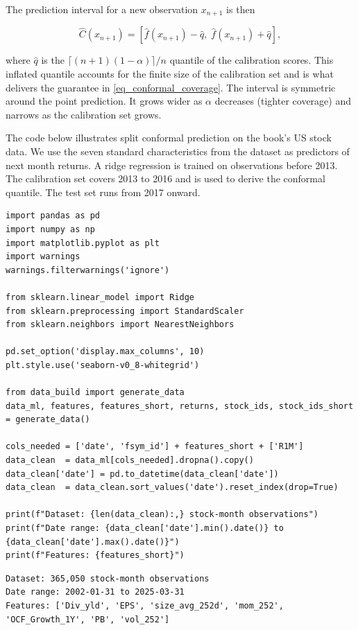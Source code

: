 The prediction interval for a new observation $x_{n+1}$ is then

\begin{equation}
\label{eq_conformal_interval}
\hat{C}(x_{n+1}) = [\hat{f}(x_{n+1}) - \hat{q},\; \hat{f}(x_{n+1}) + \hat{q}],
\end{equation}

where $\hat{q}$ is the $\lceil(n+1)(1 -\alpha)\rceil/n$ quantile of the calibration scores. This inflated quantile accounts for the finite size of the calibration set and is what delivers the guarantee in \ref{eq_conformal_coverage}. The interval is symmetric around the point prediction. It grows wider as $\alpha$ decreases (tighter coverage) and narrows as the calibration set grows.

The code below illustrates split conformal prediction on the book's US stock data. We use the seven standard characteristics from the dataset as predictors of next month returns. A ridge regression is trained on observations before 2013. The calibration set covers 2013 to 2016 and is used to derive the conformal quantile. The test set runs from 2017 onward.

\begin{verbatim}
import pandas as pd
import numpy as np
import matplotlib.pyplot as plt
import warnings
warnings.filterwarnings('ignore')

from sklearn.linear_model import Ridge
from sklearn.preprocessing import StandardScaler
from sklearn.neighbors import NearestNeighbors

pd.set_option('display.max_columns', 10)
plt.style.use('seaborn-v0_8-whitegrid')

from data_build import generate_data
data_ml, features, features_short, returns, stock_ids, stock_ids_short = generate_data()

cols_needed = ['date', 'fsym_id'] + features_short + ['R1M']
data_clean  = data_ml[cols_needed].dropna().copy()
data_clean['date'] = pd.to_datetime(data_clean['date'])
data_clean  = data_clean.sort_values('date').reset_index(drop=True)

print(f"Dataset: {len(data_clean):,} stock-month observations")
print(f"Date range: {data_clean['date'].min().date()} to {data_clean['date'].max().date()}")
print(f"Features: {features_short}")
\end{verbatim}

\begin{verbatim}
Dataset: 365,050 stock-month observations
Date range: 2002-01-31 to 2025-03-31
Features: ['Div_yld', 'EPS', 'size_avg_252d', 'mom_252', 'OCF_Growth_1Y', 'PB', 'vol_252']
\end{verbatim}

